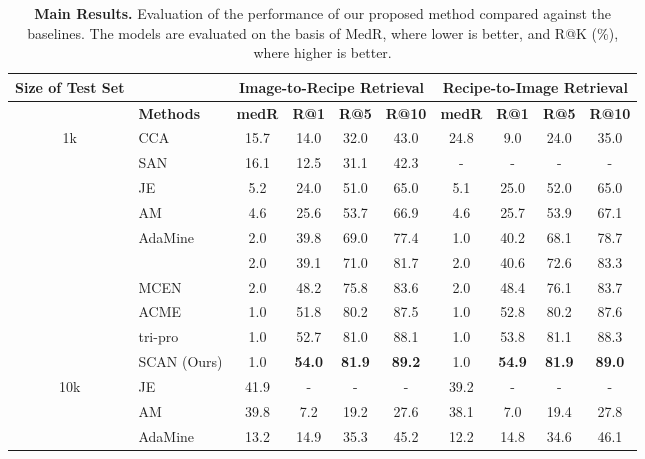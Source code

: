 \documentclass[journal]{IEEEtran}
\begin{document}
\begin{table*}[h!]
  \centering
    \caption{\textbf{Main Results.} Evaluation of the performance of our proposed method compared against the baselines. The models are evaluated on the basis of MedR, where lower is better, and R@K (\%), where higher is better.}
  \begin{tabular}{clcccccccc}
  \toprule
   \textbf{Size of Test Set} && \multicolumn{4}{c}{\textbf{Image-to-Recipe Retrieval}} & \multicolumn{4}{c}{\textbf{Recipe-to-Image Retrieval} }\\
    \midrule
    \multicolumn{1}{c}{} & \textbf{Methods} & \textbf{medR } & \textbf{R@1 } &\textbf{R@5 }& \textbf{R@10 } &  \textbf{medR } & \textbf{R@1 } & \textbf{R@5 }& \textbf{R@10 } \\
    \midrule
	\multirow{10}{*}{{1k}} 
        &CCA \cite{hotelling1936relations}& 15.7 & 14.0 & 32.0 & 43.0 & 24.8 & 9.0 & 24.0 & 35.0 \\
        &SAN \cite{chen2017cross}& 16.1 & 12.5 & 31.1 & 42.3 & - & - & - & -\\
        &JE \cite{salvador2017learning}& 5.2 & 24.0 & 51.0 & 65.0 & 5.1 & 25.0 & 52.0 & 65.0  \\
        &AM \cite{chen2018deep}& 4.6 & 25.6 & 53.7 & 66.9 & 4.6 & 25.7 & 53.9 & 67.1  \\
        &AdaMine \cite{carvalho2018cross}& 2.0 & 39.8 & 69.0 & 77.4 & 1.0 & 40.2 & 68.1 & 78.7 \\
        & ~\cite{zhu2019r2gan} & 2.0 & 39.1 & 71.0 & 81.7 & 2.0 & 40.6 & 72.6 & 83.3 \\
        &MCEN \cite{fu2020mcen} & 2.0 & 48.2 & 75.8 & 83.6 & 2.0 & 48.4 & 76.1 & 83.7 \\
        &ACME \cite{wang2019learning} & 1.0 & 51.8 & 80.2 & 87.5 & 1.0 & 52.8 & 80.2 & 87.6 \\
        &tri-pro \cite{zan2020sentence} & 1.0 & 52.7 & 81.0 & 88.1 & 1.0 & 53.8 & 81.1 & 88.3 \\
        &SCAN (Ours) & 1.0 & \textbf{54.0}  & \textbf{81.9}  & \textbf{89.2}  & 1.0 & \textbf{54.9}  & \textbf{81.9}  & \textbf{89.0} \\
    \midrule
	\multirow{8}{*}{{10k}} 
	& JE \cite{salvador2017learning} & 41.9 & - & - & - & 39.2 & - & - & - \\
	&AM \cite{chen2018deep}& 39.8 & 7.2 & 19.2 & 27.6 & 38.1 & 7.0 & 19.4 & 27.8  \\ 
    &AdaMine \cite{carvalho2018cross}& 13.2 & 14.9 & 35.3 & 45.2 & 12.2 & 14.8 & 34.6 & 46.1\\

\end{tabular}
\end{table*}
\end{document}

